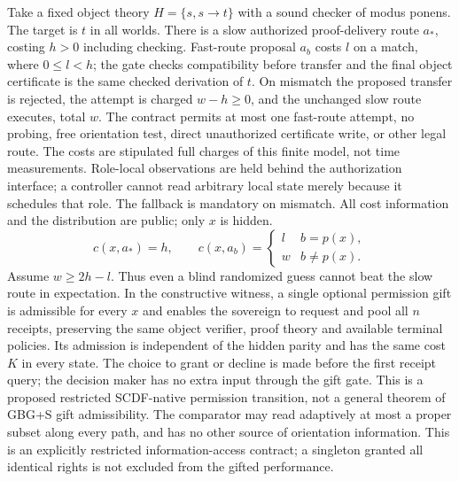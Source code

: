\documentclass[11pt,letterpaper]{article}
\begin{document}
Take a fixed object theory $H=\{s,s\to t\}$ with a sound checker of modus ponens. The target is $t$ in all worlds. There is a slow authorized proof-delivery route $a_*$, costing $h>0$ including checking. Fast-route proposal $a_b$ costs $l$ on a match, where $0\le l<h$; the gate checks compatibility before transfer and the final object certificate is the same checked derivation of $t$. On mismatch the proposed transfer is rejected, the attempt is charged $w-h\ge0$, and the unchanged slow route executes, total $w$. The contract permits at most one fast-route attempt, no probing, free orientation test, direct unauthorized certificate write, or other legal route. The costs are stipulated full charges of this finite model, not time measurements. Role-local observations are held behind the authorization interface; a controller cannot read arbitrary local state merely because it schedules that role. The fallback is mandatory on mismatch. All cost information and the distribution are public; only $x$ is hidden.
\[
 c(x,a_*)=h,\qquad c(x,a_b)=\begin{cases}l&b=p(x),\\ w&b\ne p(x).\end{cases}
\]
Assume $w\ge2h-l$. Thus even a blind randomized guess cannot beat the slow route in expectation. In the constructive witness, a single optional permission gift is admissible for every $x$ and enables the sovereign to request and pool all $n$ receipts, preserving the same object verifier, proof theory and available terminal policies. Its admission is independent of the hidden parity and has the same cost $K$ in every state. The choice to grant or decline is made before the first receipt query; the decision maker has no extra input through the gift gate. This is a proposed restricted SCDF-native permission transition, not a general theorem of GBG+S gift admissibility. The comparator may read adaptively at most a proper subset along every path, and has no other source of orientation information. This is an explicitly restricted information-access contract; a singleton granted all identical rights is not excluded from the gifted performance.
\end{document}
